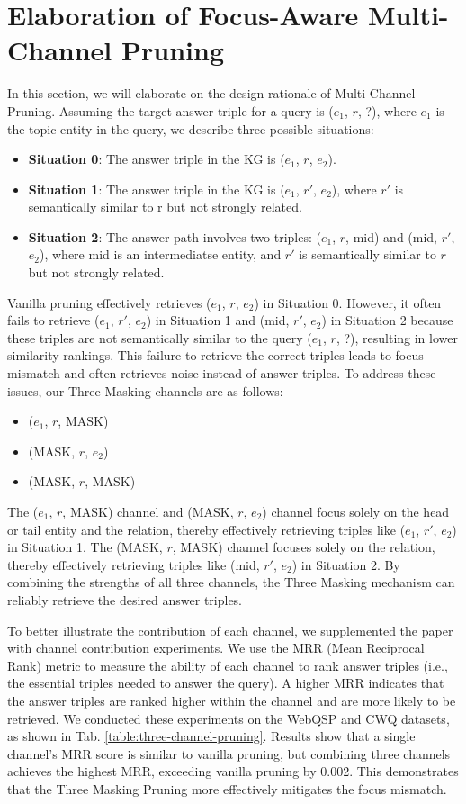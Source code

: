 \documentclass[11pt]{article}
\begin{document}
\section{Elaboration of Focus-Aware Multi-Channel Pruning}
\label{elaboration-Focus-Aware Multi-Channel Pruning}
In this section, we will elaborate on the design rationale of Multi-Channel Pruning. Assuming the target answer triple for a query is ($e_1$, $r$, ?), where $e_1$ is the topic entity in the query, we describe three possible situations:
\begin{itemize}
\item \textbf{Situation 0}: The answer triple in the KG is ($e_1$, $r$, $e_2$).
\item \textbf{Situation 1}: The answer triple in the KG is ($e_1$, $r'$, $e_2$), where $r'$ is semantically similar to r but not strongly related.
\item \textbf{Situation 2}: The answer path involves two triples: ($e_1$, $r$, mid) and (mid, $r'$, $e_2$), where mid is an intermediatse entity, and $r'$ is semantically similar to $r$ but not strongly related.
\end{itemize}
Vanilla pruning effectively retrieves ($e_1$, $r$, $e_2$) in Situation 0. However, it often fails to retrieve ($e_1$, $r'$, $e_2$) in Situation 1 and (mid, $r'$, $e_2$) in Situation 2 because these triples are not semantically similar to the query ($e_1$, $r$, ?), resulting in lower similarity rankings. This failure to retrieve the correct triples leads to focus mismatch and often retrieves noise instead of answer triples.
To address these issues, our Three Masking channels are as follows:
\begin{itemize}
\item ($e_1$, $r$, MASK)

\item (MASK, $r$, $e_2$)

\item (MASK, $r$, MASK)
\end{itemize}
The ($e_1$, $r$, MASK) channel and (MASK, $r$, $e_2$) channel focus solely on the head or tail entity and the relation, thereby effectively retrieving triples like ($e_1$, $r'$, $e_2$) in Situation 1. The (MASK, $r$, MASK) channel focuses solely on the relation, thereby effectively retrieving triples like (mid, $r'$, $e_2$) in Situation 2. By combining the strengths of all three channels, the Three Masking mechanism can reliably retrieve the desired answer triples.

To better illustrate the contribution of each channel, we supplemented the paper with channel contribution experiments. We use the MRR (Mean Reciprocal Rank) metric to measure the ability of each channel to rank answer triples (i.e., the essential triples needed to answer the query). A higher MRR indicates that the answer triples are ranked higher within the channel and are more likely to be retrieved. We conducted these experiments on the WebQSP and CWQ datasets, as shown in Tab. \ref{table:three-channel-pruning}. Results show that a single channel's MRR score is similar to vanilla pruning, but combining three channels achieves the highest MRR, exceeding vanilla pruning by 0.002. This demonstrates that the Three Masking Pruning more effectively mitigates the focus mismatch.
\end{document}
